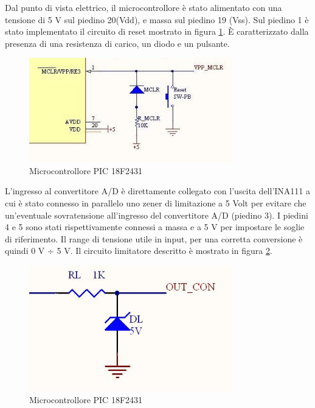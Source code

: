 \documentclass[12pt,a4paper,oneside,openright,italian]{article}
\begin{document}
Dal punto di vista elettrico, il microcontrollore \`e stato alimentato con una tensione di 5 V sul piedino 20(Vdd), e massa sul piedino 19 (Vss). Sul piedino 1 \`e stato implementato il circuito di reset mostrato in figura \ref{reset}. \`E caratterizzato dalla presenza di una resistenza di carico, un diodo e un pulsante.

\begin{figure}[!hbp]
  \centering
  \includegraphics[width=250pt]{immagini/reset.jpg}
  \caption{Microcontrollore PIC 18F2431}
  \label{reset}
\end{figure}

L'ingresso al convertitore A/D \`e direttamente collegato con l'uscita dell'INA111 a cui \`e stato connesso in parallelo uno zener di limitazione a 5 Volt per evitare che un'eventuale sovratensione all'ingresso del convertitore A/D (piedino 3). I piedini 4 e 5 sono stati rispettivamente connessi a massa e a 5 V per impostare le soglie di riferimento. Il range di tensione utile in input, per una corretta conversione \`e quindi 0 V ÷ 5 V. Il circuito limitatore descritto \`e mostrato in figura \ref{limitatore}.

\begin{figure}[!hbp]
  \centering
  \includegraphics[width=250pt]{immagini/limitatore.jpg}
  \caption{Microcontrollore PIC 18F2431}
  \label{limitatore}
\end{figure}

\newpage
\end{document}
